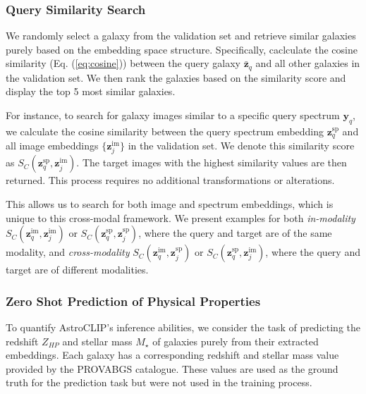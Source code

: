 \documentclass[a4paper,12pt]{article}
\begin{document}
\subsubsection{Query Similarity Search}
We randomly select a galaxy from the validation set and retrieve similar galaxies purely based on the embedding space structure. Specifically, caclculate the cosine similarity (Eq. (\ref{eq:cosine})) between the query galaxy $\bar{\mathbf{z}}_q$ and all other galaxies in the validation set. We then rank the galaxies based on the similarity score and display the top 5 most similar galaxies.

For instance, to search for galaxy images similar to a specific query spectrum $\mathbf{y}_q$, we calculate the cosine similarity between the query spectrum embedding $\mathbf{z}^{\text{sp}}_q$ and all image embeddings $\{ \mathbf{z}^{\text{im}}_j \}$ in the validation set. We denote this similarity score as $S_C(\mathbf{z}^{\text{sp}}_q, \mathbf{z}^{\text{im}}_j)$. The target images with the highest similarity values are then returned. This process requires no additional transformations or alterations.

This allows us to search for both image and spectrum embeddings, which is unique to this cross-modal framework. We present examples for both \emph{in-modality} $S_{C}(\mathbf{z}^{\text{im}}_q, \mathbf{z}^{\text{im}}_j)$ or $S_{C}(\mathbf{z}^{\text{sp}}_q, \mathbf{z}^{\text{sp}}_j)$, where the query and target are of the same modality, and \emph{cross-modality} $S_{C}(\mathbf{z}^{\text{im}}_q, \mathbf{z}^{\text{sp}}_j)$ or $S_{C}(\mathbf{z}^{\text{sp}}_q, \mathbf{z}^{\text{im}}_j)$, where the query and target are of different modalities.





\subsubsection{Zero Shot Prediction of Physical Properties}
To quantify AstroCLIP's inference abilities, we consider the task of predicting the redshift $Z_{HP}$ and stellar mass $M_{\star}$ of galaxies purely from their extracted embeddings. Each galaxy has a corresponding redshift and stellar mass value provided by the PROVABGS catalogue. These values are used as the ground truth for the prediction task but were not used in the training process.
\end{document}
